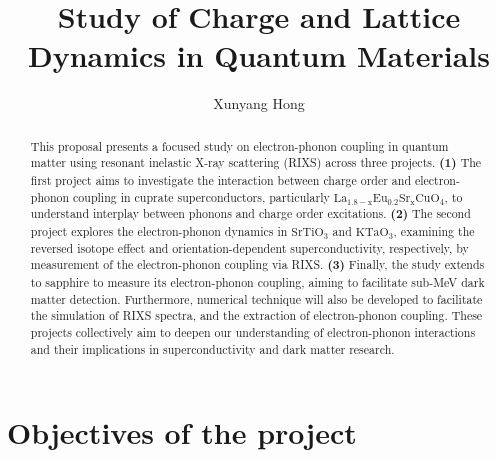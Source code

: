 \documentclass[11pt]{article}
\begin{document}
\title{Study of Charge and Lattice Dynamics in Quantum Materials}
\author{Xunyang Hong}
\date{}
\maketitle





\begin{abstract}
This proposal presents a focused study on electron-phonon coupling in quantum matter using resonant inelastic X-ray scattering (RIXS) across three projects. \textbf{(1)} The first project aims to investigate the interaction between charge order and electron-phonon coupling in cuprate superconductors, particularly $\mathrm{La_{1.8-x}Eu_{0.2}Sr_xCuO_{4}}$, to understand interplay between phonons and charge order excitations. \textbf{(2)} The second project explores the electron-phonon dynamics in $\mathrm{SrTiO_{3}}$ and $\mathrm{KTaO_{3}}$, examining the reversed isotope effect and orientation-dependent superconductivity, respectively, by measurement of the electron-phonon coupling via RIXS. \textbf{(3)} Finally, the study extends to sapphire to measure its electron-phonon coupling, aiming to facilitate sub-MeV dark matter detection.
Furthermore, numerical technique will also be developed to facilitate the simulation of RIXS spectra, and the extraction of electron-phonon coupling. These projects collectively aim to deepen our understanding of electron-phonon interactions and their implications in superconductivity and dark matter research.
\end{abstract}

\section{Objectives of the project}

\end{document}
